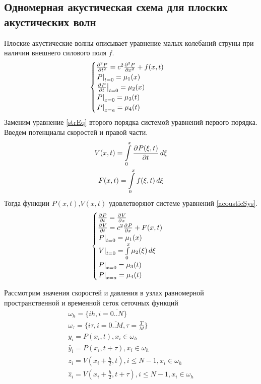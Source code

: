 \documentclass[a4paper, fontsize=14pt]{article}
\begin{document}
\subsection{Одномерная акустическая схема для плоских акустических волн}
Плоские акустические волны описывает уравнение малых колебаний струны при наличии внешнего силового
поля $f$.
\begin{equation}
    \label{strEq}
    \begin{cases}
        \diff[2]{P}{t} = c^2 \diff[2]{P}{x} + f(x,t)\\
        \subs{t=0}{P} = \mu_1(x)\\
        \subs{t=0}{\diff{P}{t}} = \mu_2(x)\\
        \subs{x=0}{P} = \mu_3(t)\\
        \subs{x=a}{P} = \mu_4(t)\\
    \end{cases}
\end{equation}
Заменим уравнение \ref{strEq} второго порядка системой уравнений первого порядка. Введем потенциалы скоростей и
правой части.
\begin{gather*}
    V(x,t) = \int \limits_0^x \frac{\partial ^ {  } P(\xi,t)}{\partial t ^ {  } } \,d\xi\\
    F(x,t) = \int \limits_0^x f(\xi,t) \,d\xi
\end{gather*}
Тогда функции $P(x,t)$,$V(x,t)$ удовлетворяют системе уравнений \ref{acousticSys}. 
\begin{equation}
    \label{acousticSys}
    \begin{cases}
        \diff{P}{t} = \diff{V}{x}\\
        \diff{V}{t} = c^2 \diff{P}{x} + F(x,t)\\
        \subs{t=0}{P} = \mu_1(x)\\
        \subs{t=0}{V} = \int \limits_0^x \mu_2(\xi) \,d\xi\\
        \subs{x=0}{P} = \mu_3(t)\\
        \subs{x=a}{P} = \mu_4(t)\\
    \end{cases}
\end{equation}

Рассмотрим значения скоростей и давления в узлах равномерной пространственной и временной сеток
сеточных функций 
\begin{gather*}
    \omega_h =\{ih, i=\overline{0..N}\} \\ 
    \omega_\tau =\{i\tau,i=\overline{0..M},\tau = \frac{T}{M}\}\\
    y_i = P(x_i,t), x_i \in \omega_h\\
    \hat{y}_i = P(x_i,t+\tau), x_i \in \omega_h\\
    z_i = V\left(x_i+\frac{h}{2},t\right), i \leq N-1,x_i\in \omega_h\\
    \hat{z}_i = V\left(x_i+\frac{h}{2},t+\tau\right), i \leq N-1,x_i\in \omega_h\\
\end{gather*}
\end{document}
